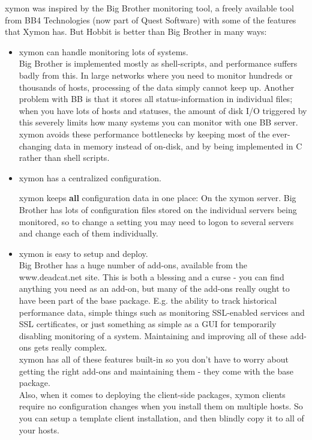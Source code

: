  xymon was inspired by the Big Brother monitoring tool, a freely available tool from BB4 Technologies (now part of Quest Software) with some of the features that Xymon has. But Hobbit is better than Big Brother in many ways:
\begin{itemize}
\item xymon can handle monitoring lots of systems.\\ 


 Big Brother is implemented mostly as shell-scripts, and performance suffers badly from this. In large networks where you need to monitor hundreds or thousands of hosts, processing of the data simply cannot keep up. Another problem with BB is that it stores all status-information in individual files; when you have lots of hosts and statuses, the amount of disk I/O triggered by this severely limits how many systems you can monitor with one BB server.\\ 
 xymon avoids these performance bottlenecks by keeping most of the ever-changing data in memory instead of on-disk, and by being implemented in C rather than shell scripts.

\item xymon has a centralized configuration. 

 xymon keeps \textbf{all}
 configuration data in one place: On the xymon server. Big Brother has lots of configuration files stored on the individual servers being monitored, so to change a setting you may need to logon to several servers and change each of them individually.

\item xymon is easy to setup and deploy.\\ 


 Big Brother has a huge number of add-ons, available from the www.deadcat.net site. This is both a blessing and a curse - you can find anything you need as an add-on, but many of the add-ons really ought to have been part of the base package. E.g. the ability to track historical performance data, simple things such as monitoring SSL-enabled services and SSL certificates, or just something as simple as a GUI for temporarily disabling monitoring of a system. Maintaining and improving all of these add-ons gets really complex.\\ 
 xymon has all of these features built-in so you don't have to worry about getting the right add-ons and maintaining them - they come with the base package.\\ 
 Also, when it comes to deploying the client-side packages, xymon clients require no configuration changes when you install them on multiple hosts. So you can setup a template client installation, and then blindly copy it to all of your hosts.


\end{itemize}
